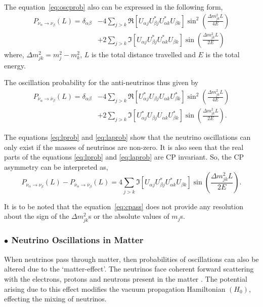 The equation~\ref{eq:oscprob} also can be expressed in the following
form,
\begin{align}
  P_{\nu_\alpha\rightarrow\nu_\beta}\left(L\right) = \delta_{\alpha\beta} & -4\sum_{j>k}\Re\left[U_{\alpha j}U^{*}_{\beta j}U^{*}_{\alpha k}U_{\beta k}\right]\sin^2\left(\frac{\Delta m^2_{jk}L}{4E}\right) \nonumber\\
  & +2\sum_{j>k}\Im\left[U_{\alpha j}U^{*}_{\beta j}U^{*}_{\alpha k}U_{\beta k}\right]\sin\left(\frac{\Delta m^2_{jk}L}{2E}\right)
  \label{eq:lprob}
\end{align}
where, $\Delta m^2_{jk}=m^2_{j}-m^2_{k}$, $L$ is the total distance
travelled and $E$ is the total energy.

The oscillation probability for the anti-neutrinos thus given by
\begin{align}
  P_{\bar{\nu}_\alpha\rightarrow\bar{\nu}_\beta}\left(L\right) = \delta_{\alpha\beta} & -4\sum_{j>k}\Re\left[U^{*}_{\alpha j}U_{\beta j}U_{\alpha k}U^{*}_{\beta k}\right]\sin^2\left(\frac{\Delta m^2_{jk}L}{4E}\right) \nonumber\\
  & +2\sum_{j>k}\Im\left[U^{*}_{\alpha j}U_{\beta j}U_{\alpha k}U^{*}_{\beta k}\right]\sin\left(\frac{\Delta m^2_{jk}L}{2E}\right).
  \label{eq:laprob}
\end{align}

The equations \ref{eq:lprob} and \ref{eq:laprob} show that the neutrino
oscillations can only exist if the masses of neutrinos are
non-zero. It is also seen that the real parts of the equations
\ref{eq:lprob} and \ref{eq:laprob} are CP invariant. So, the CP
asymmetry can be interpreted as,
\begin{equation}  P_{\nu_\alpha\rightarrow\nu_\beta}\left(L\right)-P_{\bar{\nu}_\alpha\rightarrow\bar{\nu}_\beta}\left(L\right) = 4\sum_{j>k}\Im\left[U_{\alpha j}U^{*}_{\beta j}U^{*}_{\alpha k}U_{\beta k}\right]\sin\left(\frac{\Delta m^2_{jk}L}{2E}\right).
  \label{eq:cpass}
\end{equation}

It is to be noted that the equation~\ref{eq:cpass} does not provide
any resolution about the sign of the $\Delta m_{jk}^{2}$s
or the absolute values of $m_{j}$s.

\subsubsection{$\bullet$ Neutrino Oscillations in Matter}

When neutrinos pass through matter, then probabilities of oscillations
can also be altered due to the `matter-effect'. The neutrinos face
coherent forward scattering with the electrons, protons and neutrons
present in the matter \cite{mattereffect}. The potential arising due to
this effect modifies the vacuum propagation Hamiltonian
$\left(H_{0}\right)$, effecting the mixing of neutrinos.

